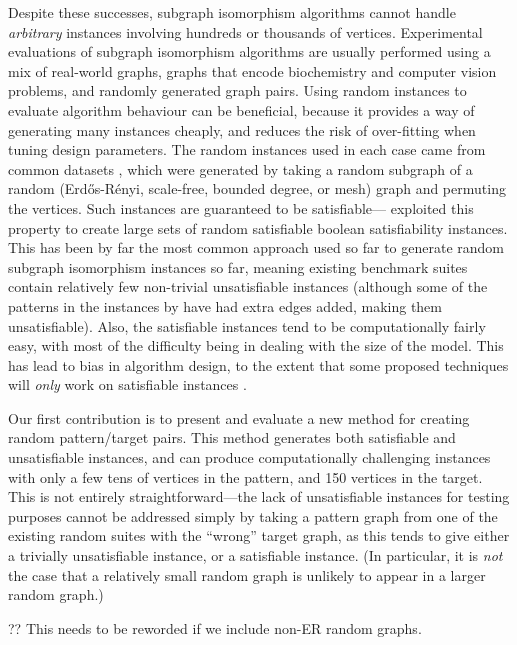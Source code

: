 \documentclass[twoside,11pt]{article}
\newcommand{\citet}[1]{\citeA{#1}}
\newcommand{\citep}[1]{\cite{#1}}
\begin{document}
Despite these successes, subgraph isomorphism algorithms cannot handle \emph{arbitrary} instances
involving hundreds or thousands of vertices. Experimental evaluations of subgraph isomorphism
algorithms are usually performed using a mix of real-world graphs, graphs that encode biochemistry
and computer vision problems, and randomly generated graph pairs. Using random instances to evaluate
algorithm behaviour can be beneficial, because it provides a way of generating many instances
cheaply, and reduces the risk of over-fitting when tuning design parameters. The random instances
used in each case came from common datasets \citep{DeSanto:2003,Zampelli:2010}, which were generated
by taking a random subgraph of a random (Erd\H{o}s-R\'enyi, scale-free, bounded degree, or mesh)
graph and permuting the vertices. Such instances are guaranteed to be
satisfiable---\citet{Anton:2009} exploited this property to create large sets of random satisfiable
boolean satisfiability instances.  This has been by far the most common approach used so far to
generate random subgraph isomorphism instances so far, meaning existing benchmark suites contain
relatively few non-trivial unsatisfiable instances (although some of the patterns in the instances
by \citeauthor{Zampelli:2010} have had extra edges added, making them unsatisfiable). Also, the
satisfiable instances tend to be computationally fairly easy, with most of the difficulty being in
dealing with the size of the model. This has lead to bias in algorithm design, to the extent that
some proposed techniques will \emph{only} work on satisfiable instances \citep{Battiti:2007}.

Our first contribution is to present and evaluate a new method for creating random pattern/target
pairs. This method generates both satisfiable and unsatisfiable instances, and can produce
computationally challenging instances with only a few tens of vertices in the pattern, and 150
vertices in the target. This is not entirely straightforward---the lack of unsatisfiable instances
for testing purposes cannot be addressed simply by taking a pattern graph from one of the
existing random suites with the ``wrong'' target graph, as this tends to give either a trivially
unsatisfiable instance, or a satisfiable instance. (In particular, it is \emph{not} the case that a
relatively small random graph is unlikely to appear in a larger random graph.)

?? This needs to be reworded if we include non-ER random graphs.
\end{document}
